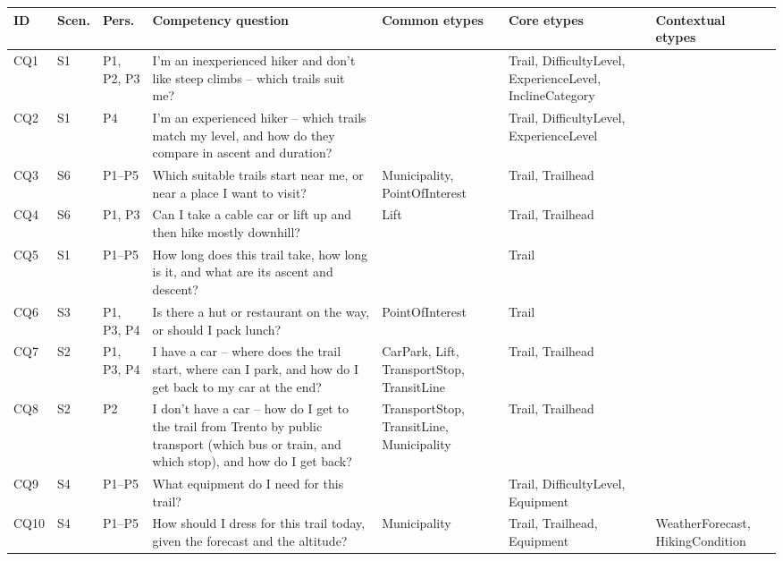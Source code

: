 \begin{table}[htbp]
\centering\footnotesize
\renewcommand{\arraystretch}{1.25}
\begin{tabular}{|>{\raggedright\arraybackslash}p{0.8cm}|>{\raggedright\arraybackslash}p{0.9cm}|>{\raggedright\arraybackslash}p{1.1cm}|>{\raggedright\arraybackslash}p{4.4cm}|>{\raggedright\arraybackslash}p{2.3cm}|>{\raggedright\arraybackslash}p{2.6cm}|>{\raggedright\arraybackslash}p{2.3cm}|}
\hline
\textbf{ID} & \textbf{Scen.} & \textbf{Pers.} & \textbf{Competency question} & \textbf{Common etypes} & \textbf{Core etypes} & \textbf{Contextual etypes} \\ \hline
CQ1 & S1 & P1, P2, P3 & I'm an inexperienced hiker and don't like steep climbs -- which trails suit me? & & Trail, DifficultyLevel, ExperienceLevel, InclineCategory & \\ \hline
CQ2 & S1 & P4 & I'm an experienced hiker -- which trails match my level, and how do they compare in ascent and duration? & & Trail, DifficultyLevel, ExperienceLevel & \\ \hline
CQ3 & S6 & P1--P5 & Which suitable trails start near me, or near a place I want to visit? & Municipality, PointOfInterest & Trail, Trailhead & \\ \hline
CQ4 & S6 & P1, P3 & Can I take a cable car or lift up and then hike mostly downhill? & Lift & Trail, Trailhead & \\ \hline
CQ5 & S1 & P1--P5 & How long does this trail take, how long is it, and what are its ascent and descent? & & Trail & \\ \hline
CQ6 & S3 & P1, P3, P4 & Is there a hut or restaurant on the way, or should I pack lunch? & PointOfInterest & Trail & \\ \hline
CQ7 & S2 & P1, P3, P4 & I have a car -- where does the trail start, where can I park, and how do I get back to my car at the end? & CarPark, Lift, TransportStop, TransitLine & Trail, Trailhead & \\ \hline
CQ8 & S2 & P2 & I don't have a car -- how do I get to the trail from Trento by public transport (which bus or train, and which stop), and how do I get back? & TransportStop, TransitLine, Municipality & Trail, Trailhead & \\ \hline
CQ9 & S4 & P1--P5 & What equipment do I need for this trail? & & Trail, DifficultyLevel, Equipment & \\ \hline
CQ10 & S4 & P1--P5 & How should I dress for this trail today, given the forecast and the altitude? & Municipality & Trail, Trailhead, Equipment & WeatherForecast, HikingCondition \\ \hline

\end{tabular}
\end{table}
